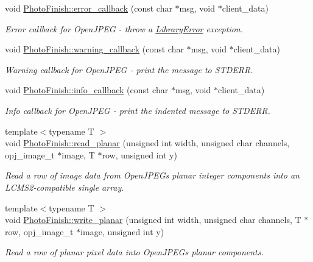 \begin{DoxyCompactItemize}
\item 
void \hyperlink{namespace_photo_finish_a8f2a0015f605e0f89ff8e2080e62abd6}{Photo\+Finish\+::error\+\_\+callback} (const char $\ast$msg, void $\ast$client\+\_\+data)
\begin{DoxyCompactList}\small\item\em Error callback for Open\+J\+P\+EG -\/ throw a \hyperlink{class_photo_finish_1_1_library_error}{Library\+Error} exception. \end{DoxyCompactList}\item 
void \hyperlink{namespace_photo_finish_a5ade5f8f065cbecf79f0d76fed6c1e97}{Photo\+Finish\+::warning\+\_\+callback} (const char $\ast$msg, void $\ast$client\+\_\+data)
\begin{DoxyCompactList}\small\item\em Warning callback for Open\+J\+P\+EG -\/ print the message to S\+T\+D\+E\+RR. \end{DoxyCompactList}\item 
void \hyperlink{namespace_photo_finish_a15b915c1ad42e83a12e30b6b1fd36785}{Photo\+Finish\+::info\+\_\+callback} (const char $\ast$msg, void $\ast$client\+\_\+data)
\begin{DoxyCompactList}\small\item\em Info callback for Open\+J\+P\+EG -\/ print the indented message to S\+T\+D\+E\+RR. \end{DoxyCompactList}\item 
{\footnotesize template$<$typename T $>$ }\\void \hyperlink{namespace_photo_finish_a10db9072258646ff5fac41ce9bd1ee52}{Photo\+Finish\+::read\+\_\+planar} (unsigned int width, unsigned char channels, opj\+\_\+image\+\_\+t $\ast$image, T $\ast$row, unsigned int y)
\begin{DoxyCompactList}\small\item\em Read a row of image data from Open\+J\+P\+EG\textquotesingle{}s planar integer components into an L\+C\+M\+S2-\/compatible single array. \end{DoxyCompactList}\item 
{\footnotesize template$<$typename T $>$ }\\void \hyperlink{namespace_photo_finish_a8ac95b8e0f1442d867620a2af03b193a}{Photo\+Finish\+::write\+\_\+planar} (unsigned int width, unsigned char channels, T $\ast$row, opj\+\_\+image\+\_\+t $\ast$image, unsigned int y)
\begin{DoxyCompactList}\small\item\em Read a row of planar pixel data into Open\+J\+P\+EG\textquotesingle{}s planar components. \end{DoxyCompactList}\item 

\end{DoxyCompactItemize}
